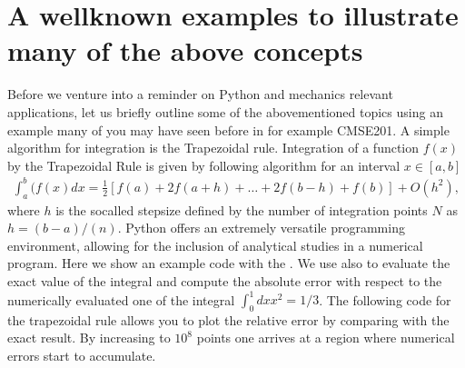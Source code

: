 \documentclass[letterpaper,10pt,english]{sphinxmanual}
\begin{document}
\section{A well\sphinxhyphen{}known examples to illustrate many of the above concepts}
\label{\detokenize{chapter1:a-well-known-examples-to-illustrate-many-of-the-above-concepts}}
Before we venture into a reminder on Python and mechanics relevant applications, let us briefly outline some of the
abovementioned topics using an example many of you may have seen before in for example CMSE201.
A simple algorithm for integration is the Trapezoidal rule.
Integration of a function \(f(x)\) by the Trapezoidal Rule is given by following algorithm for an interval \(x \in [a,b]\)
\begin{equation*}
\begin{split}
\int_a^b(f(x) dx = \frac{1}{2}\left [f(a)+2f(a+h)+\dots+2f(b-h)+f(b)\right] +O(h^2),
\end{split}
\end{equation*}
where \(h\) is the so\sphinxhyphen{}called stepsize defined by the number of integration points \(N\) as \(h=(b-a)/(n)\).
Python offers an  extremely versatile programming  environment, allowing for
the inclusion of analytical studies in a numerical program. Here we show an
example code with the . We use also  to evaluate the exact value of the integral and compute the absolute error
with respect to the numerically evaluated one of the integral
\(\int_0^1 dx x^2 = 1/3\).
The following code for  the trapezoidal rule allows you  to plot the relative error by comparing with the exact result. By increasing to \(10^8\) points one arrives at a region where numerical errors start to accumulate.
\end{document}
